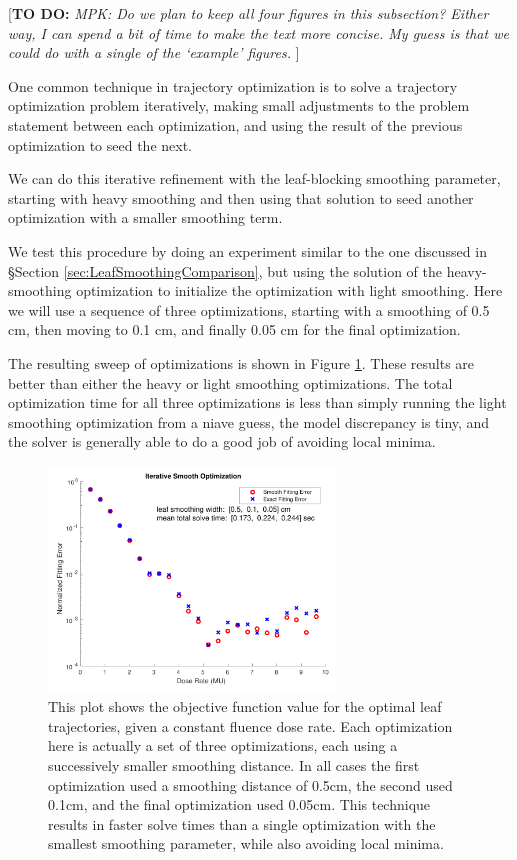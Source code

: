 \documentclass[12pt]{article}
\newcommand{\todo}[1]{{\color{lightblue}\par {[{\bf TO DO: } {\em #1}} ] \\    }}
\begin{document}
\todo{MPK:  Do we plan to keep all four figures in this subsection? Either way, I can spend a bit of time to make the text more concise. My guess is that we could do with a single of the `example' figures.}

One common technique in trajectory optimization is to solve a trajectory optimization problem
iteratively, making small adjustments to the problem statement between each optimization,
and using the result of the previous optimization to seed the next.

We can do this iterative refinement with the leaf-blocking smoothing parameter,
starting with heavy smoothing and then using that solution to seed another optimization
with a smaller smoothing term.

We test this procedure by doing an experiment similar to the one discussed in
\S Section \ref{sec:LeafSmoothingComparison}, but using the solution of the heavy-smoothing
optimization to initialize the optimization with light smoothing.
Here we will use a sequence of three optimizations, starting with a smoothing of
0.5 cm, then moving to 0.1 cm, and finally 0.05 cm for the final optimization.

The resulting sweep of optimizations is shown in Figure \ref{fig:iterSmoothSweep}.
These results are better than either the heavy or light smoothing optimizations.
The total optimization time for all three optimizations is less than simply running the
light smoothing optimization from a niave guess, the model discrepancy is tiny, and the
solver is generally able to do a good job of avoiding local minima.

\begin{figure}
  \centering
  \includegraphics[width=3in]{fig/iterSmoothSweep.pdf}
  \caption{This plot shows the objective function value for the optimal leaf trajectories,
           given a constant fluence dose rate. Each optimization here is actually a set of three
           optimizations, each using a successively smaller smoothing distance. In all cases
           the first optimization used a smoothing distance of 0.5cm, the second used 0.1cm,
           and the final optimization used 0.05cm. This technique results in faster solve times
           than a single optimization with the smallest smoothing parameter, while also avoiding
           local minima.}
  \label{fig:iterSmoothSweep}
\end{figure}
\end{document}
